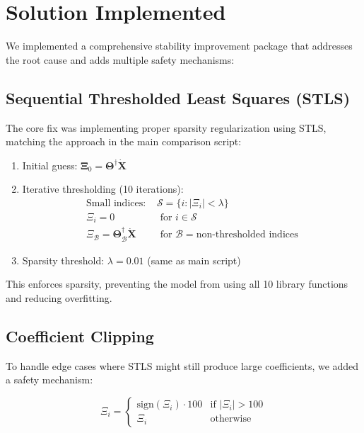 \documentclass[11pt]{article}
\begin{document}
\section{Solution Implemented}

We implemented a comprehensive stability improvement package that addresses the root cause and adds multiple safety mechanisms:

\subsection{Sequential Thresholded Least Squares (STLS)}

The core fix was implementing proper sparsity regularization using STLS, matching the approach in the main comparison script:

\begin{enumerate}
    \item Initial guess: $\boldsymbol{\Xi}_0 = \boldsymbol{\Theta}^\dagger \dot{\mathbf{X}}$
    \item Iterative thresholding (10 iterations):
    \begin{align}
        \text{Small indices: } & \mathcal{S} = \{i : |\Xi_i| < \lambda\} \\
        \Xi_i = 0 & \text{ for } i \in \mathcal{S} \\
        \Xi_{\mathcal{B}} = \boldsymbol{\Theta}_{\mathcal{B}}^\dagger \dot{\mathbf{X}} & \text{ for } \mathcal{B} = \text{non-thresholded indices}
    \end{align}
    \item Sparsity threshold: $\lambda = 0.01$ (same as main script)
\end{enumerate}

This enforces sparsity, preventing the model from using all 10 library functions and reducing overfitting.

\subsection{Coefficient Clipping}

To handle edge cases where STLS might still produce large coefficients, we added a safety mechanism:

\begin{equation}
\Xi_i = \begin{cases}
\text{sign}(\Xi_i) \cdot 100 & \text{if } |\Xi_i| > 100 \\
\Xi_i & \text{otherwise}
\end{cases}
\end{equation}
\end{document}
